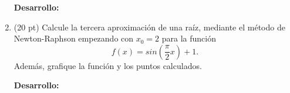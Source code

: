 \documentclass[11pt]{article}
\begin{document}
\begin{enumerate}
\textbf{Desarrollo:} 

\newpage
\item  (20 pt) Calcule la tercera aproximaci\'on de una ra\'iz, mediante el m\'etodo de Newton-Raphson empezando con $x_0=2$ para la funci\'on
$$f(x)=sin\left(\frac{\pi}{2}x \right)+1.$$
Adem\'as, grafique la funci\'on y los puntos calculados.

\textbf{Desarrollo:} 

\end{enumerate}
\end{document}
